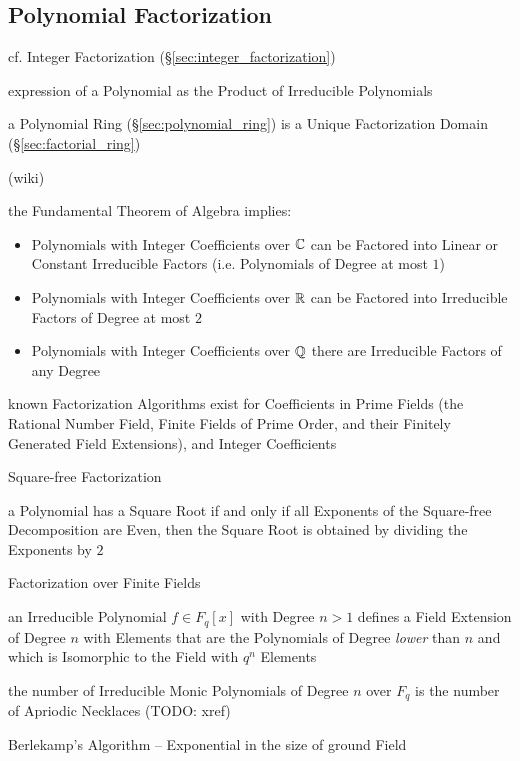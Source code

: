 \subsection{Polynomial Factorization}\label{sec:polynomial_factorization}

cf. Integer Factorization (\S\ref{sec:integer_factorization})

expression of a Polynomial as the Product of Irreducible Polynomials

a Polynomial Ring (\S\ref{sec:polynomial_ring}) is a Unique Factorization Domain
(\S\ref{sec:factorial_ring})

(wiki)

the Fundamental Theorem of Algebra implies:
\begin{itemize}
  \item Polynomials with Integer Coefficients over $\mathbb{C}$ can be Factored into
    Linear or Constant Irreducible Factors (i.e. Polynomials of Degree at most
    $1$)
  \item Polynomials with Integer Coefficients over $\mathbb{R}$ can be Factored into
    Irreducible Factors of Degree at most $2$
  \item Polynomials with Integer Coefficients over $\mathbb{Q}$ there are Irreducible
    Factors of any Degree
\end{itemize}

known Factorization Algorithms exist for Coefficients in Prime Fields (the
Rational Number Field, Finite Fields of Prime Order, and their Finitely
Generated Field Extensions), and Integer Coefficients

Square-free Factorization

a Polynomial has a Square Root if and only if all Exponents of the Square-free
Decomposition are Even, then the Square Root is obtained by dividing the
Exponents by $2$

Factorization over Finite Fields

an Irreducible Polynomial $f \in F_q[x]$ with Degree $n > 1$ defines a Field
Extension of Degree $n$ with Elements that are the Polynomials of Degree
\emph{lower} than $n$ and which is Isomorphic to the Field with $q^n$ Elements

the number of Irreducible Monic Polynomials of Degree $n$ over $F_q$ is the
number of Apriodic Necklaces (TODO: xref)

Berlekamp's Algorithm -- Exponential in the size of ground Field

